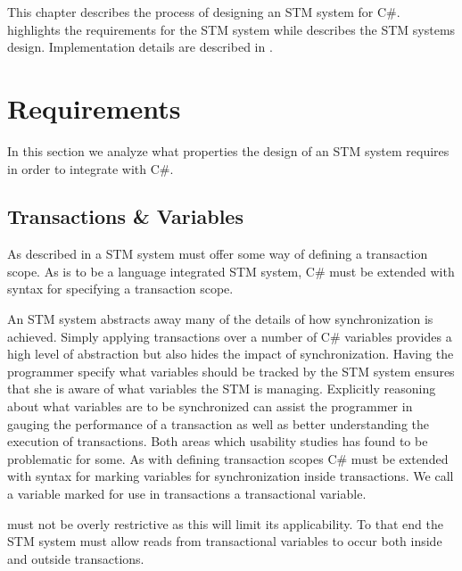 \makeatletter {}\makeatother
{}
This chapter describes the process of designing an \ac{STM} system for C\#.  highlights the requirements for the \ac{STM} system while  describes the \ac{STM} systems design. Implementation details are described in .
\label{chap:stm_design}
\section{Requirements}
\label{sec:stm_requirements}
In this section we analyze what properties the design of an \ac{STM} system requires in order to integrate with C\#.
\subsection{Transactions \& Variables}
As described in  a \ac{STM} system must offer some way of defining a transaction scope. As \stmnamesp is to be a language integrated \ac{STM} system, C\# must be extended with syntax for specifying a transaction scope.

An \ac{STM} system abstracts away many of the details of how synchronization is achieved. Simply applying transactions over a number of C\# variables provides a high level of abstraction but also hides the impact of synchronization. Having the programmer specify what variables should be tracked by the \ac{STM} system ensures that she is aware of what variables the \ac{STM} is managing. Explicitly reasoning about what variables are to be synchronized can assist the programmer in gauging the performance of a transaction as well as better understanding the execution of transactions. Both areas which usability studies\cite{rossbach2010transactional}\cite{pankratius2009does} has found to be problematic for some. As with defining transaction scopes C\# must be extended with syntax for marking variables for synchronization inside transactions. We call a variable marked for use in transactions a transactional variable.

\stmnamesp must not be overly restrictive as this will limit its applicability. To that end the \ac{STM} system must allow reads from transactional variables to occur both inside and outside transactions. 

